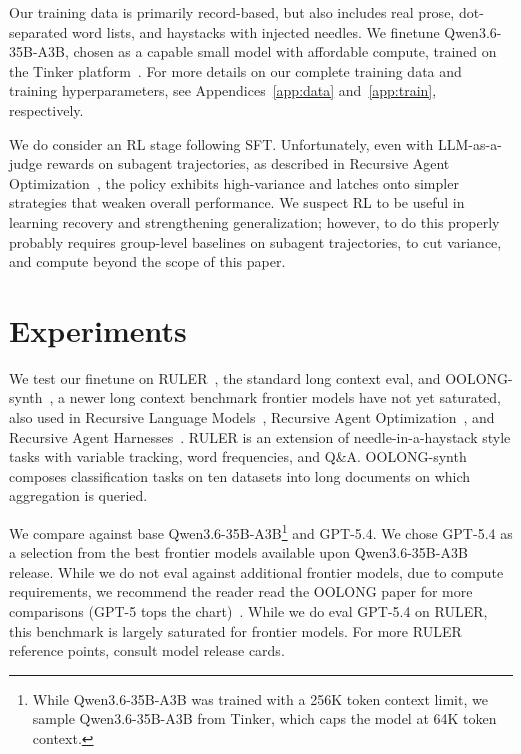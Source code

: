 \documentclass{article} %
\begin{document}
Our training data is primarily record-based, but also includes real prose, dot-separated word lists, and haystacks with injected needles. We finetune Qwen3.6-35B-A3B, chosen as a capable small model with affordable compute, trained on the Tinker platform~\citep{thinkingmachines2025tinker,thinkingmachines2025tinkercookbook}. For more details on our complete training data and training hyperparameters, see Appendices~\ref{app:data} and~\ref{app:train}, respectively.

We do consider an RL stage following SFT. Unfortunately, even with LLM-as-a-judge rewards on subagent trajectories, as described in Recursive Agent Optimization~\cite{gandhi2026rao}, the policy exhibits high-variance and latches onto simpler strategies that weaken overall performance. We suspect RL to be useful in learning recovery and strengthening generalization; however, to do this properly probably requires group-level baselines on subagent trajectories, to cut variance, and compute beyond the scope of this paper.
 

\section{Experiments}
\label{experiments}

We test our finetune on RULER~\citep{hsieh2024ruler}, the standard long context eval, and OOLONG-synth~\citep{bertsch2025oolong}, a newer long context benchmark frontier models have not yet saturated, also used in Recursive Language Models~\citep{zhang2025rlm}, Recursive Agent Optimization~\citep{gandhi2026rao}, and Recursive Agent Harnesses~\citep{lumer2026rah}. RULER is an extension of needle-in-a-haystack style tasks with variable tracking, word frequencies, and Q\&A. OOLONG-synth composes classification tasks on ten datasets into long documents on which aggregation is queried.

We compare against base Qwen3.6-35B-A3B\footnote{While Qwen3.6-35B-A3B was trained with a 256K token context limit, we sample Qwen3.6-35B-A3B from Tinker, which caps the model at 64K token context.} and GPT-5.4. We chose GPT-5.4 as a selection from the best frontier models available upon Qwen3.6-35B-A3B release. While we do not eval against additional frontier models, due to compute requirements, we recommend the reader read the OOLONG paper for more comparisons (GPT-5 tops the chart)~\citep{bertsch2025oolong}. While we do eval GPT-5.4 on RULER, this benchmark is largely saturated for frontier models. For more RULER reference points, consult model release cards.
\end{document}
